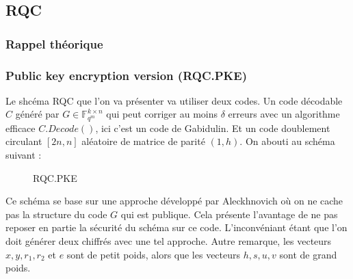 \documentclass[12pt]{article}
\begin{document}
\subsection{RQC}

\subsubsection{Rappel théorique}

\subsubsection{Public key encryption version (RQC.PKE)}
Le shcéma RQC que l'on va présenter va utiliser deux codes. Un code décodable $C$ généré par $G \in \mathbb{F}_{q^m}^{k \times n}$ qui peut corriger au moins $\delta$ erreurs avec un algorithme efficace $C.Decode()$, ici c'est un code de Gabidulin. Et un code doublement circulant $[2n,n]$ aléatoire de matrice de parité $(1,h)$. On abouti au schéma suivant : 

\begin{figure}
    \centering
\noindent{}
    \caption{RQC.PKE}
    \label{fig:RQC.PKE}
\end{figure}
Ce schéma se base sur une approche développé par Aleckhnovich où on ne cache pas la structure du code $G$ qui est publique. Cela présente l'avantage de ne pas reposer en partie la sécurité du schéma sur ce code. L'inconvéniant étant que l'on doit générer deux chiffrés avec une tel approche. 
\newline
Autre remarque, les vecteurs $x,y,r_1,r_2$ et $e$ sont de petit poids, alors que les vecteurs $h,s,u,v$ sont de grand poids.
\end{document}
